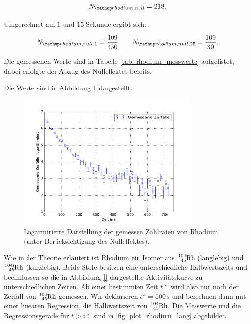 \begin{equation*}
  N\ua{rhodium,null}=218.
\end{equation*}

Umgerechnet auf $1$ und $15$ Sekunde ergibt sich:

\begin{equation*}
    N\ua{rhodium,null,1}=\frac{109}{450} \qquad N\ua{rhodium,null,25}=\frac{109}{30}.
\end{equation*}

Die gemessenen Werte sind in Tabelle \ref{tab: rhodium_messwerte} aufgelistet, dabei erfolgte
der Abzug des Nulleffektes bereits.


Die Werte sind in Abbildung \ref{fig: plot_rhodium} dargestellt.

\begin{figure}
  \centering
  \includegraphics[width=0.8\textwidth]{pics/ra_all.pdf}
  \caption{Logarmirierte Darstellung der gemessen Zählraten von Rhodium (unter Berücksichtigung des Nulleffektes).}
  \label{fig: plot_rhodium}
\end{figure}




Wie in der Theorie erläutert ist Rhodium ein Isomer aus $\ce{^{104}_{45} Rh}$ (langlebig) und
$\ce{^{104i}_{45} Rh}$ (kurzlebig). Beide Stofe besitzen eine unterschiedliche Halbwertszeits und
beeinflussen so die in Abbildung \ref{} dargestellte Aktivitätskurve zu unterschiedlichen
Zeiten.
Ab einer bestimmten Zeit $t*$ wird also nur noch der Zerfall von $\ce{^{104}_{45} Rh}$
gemessen.
Wir deklarieren $t*=\SI{500}{\second}$ und berechnen dann mit einer linearen Regression,
die Halbwertszeit von $\ce{^{104}_{45} Rh}$.
Die Messwerte und die Regressionsgerade für $t>t*$ sind in \ref{fig: plot_rhodium_lang} abgebildet.

